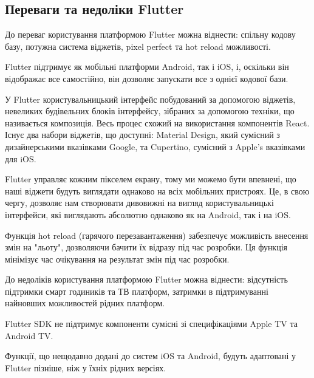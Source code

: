 \subsection{Переваги та недоліки Flutter}
\label{sec:flutter_pros_cons}

До переваг користування платформою Flutter можна віднести:
спільну кодову базу, потужна система віджетів, pixel perfect та hot reload можливості.

Flutter підтримує як мобільні платформи Android, так і iOS, і,
оскільки він відображає все самостійно, він дозволяє запускати все з однієї кодової бази.

У Flutter користувальницький інтерфейс побудований за допомогою віджетів,
невеликих будівельних блоків інтерфейсу, зібраних за допомогою техніки, що називається композиція.
Весь процес схожий на використання компонентів React.
Існує два набори віджетів, що доступні: Material Design, який сумісний з дизайнерськими вказівками Google,
та Cupertino, сумісний з Apple's вказівками для iOS.

Flutter управляє кожним пікселем екрану, тому ми можемо бути впевнені, що наші віджети будуть виглядати
однаково на всіх мобільних пристроях. Це, в свою чергу, дозволяє нам створювати дивовижні на вигляд
користувальницькі інтерфейси, які виглядають абсолютно однаково як на Android, так і на iOS.

Функція hot reload (гарячого перезавантаження) забезпечує можливість внесення змін на "льоту", дозволяючи бачити їх відразу під час розробки.
Ця функція мінімізує час очікування на результат змін під час розробки.

До недоліків користування платформою Flutter можна віднести:
відсутність підтримки смарт годиників та ТВ платформ,
затримки в підтримуванні найновших можливостей рідних платформ.

Flutter SDK не підтримує компоненти сумісні зі специфікаціями Apple TV та Android TV.

Функції, що нещодавно додані до систем iOS та Android, будуть адаптовані у Flutter пізніше, ніж у їхніх рідних версіях.

